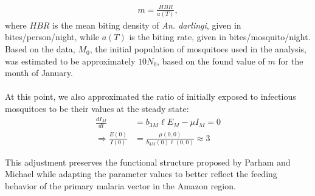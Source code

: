 \documentclass[a4paper,fleqn]{cas-dc}
\begin{document}
\begin{align} 
m = \frac{HBR}{a(T)},
\end{align}
where $HBR$ is the mean biting density of \textit{An. darlingi}, given in bites/person/night, while $a(T)$ is the biting rate, given in bites/mosquito/night. Based on the data, $M_0$, the initial population of mosquitoes used in the analysis, was estimated to be
approximately $10 N_0$, based on the found value of $m$ for the month of January. 
\\\\
At this point, we also approximated the ratio of initially exposed to infectious mosquitoes to be their values at the steady state: 
\begin{align*}
\frac{dI_M}{dt}&=b_{3M}\ell E_M - \mu I_M=0 \\ \Longrightarrow \frac{E(0)}{I(0)}&=\frac{\mu(0,0)}{b_{3M}(0)\ell(0,0)}\approx3
\end{align*}

This adjustment preserves the functional structure proposed by Parham and Michael while adapting the parameter values to better reflect the feeding behavior of the primary malaria vector in the Amazon region.
\end{document}
